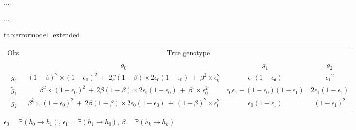 

\begin{table}[!htb]
{...

...}
{tab:errormodel_extended}
\centering
\small
\begin{threeparttable}
\renewcommand{\arraystretch}{1.1}%
\begin{tabular}{cccc}
\toprule
 Obs. & \multicolumn{3}{c}{True genotype} \\ \cmidrule(lr){2-4}
  & $g_0$ & $g_1$ & $g_2$ \\ \midrule
$\tilde{g}_0$
	&  $(1-\beta)^2\times(1-\epsilon_0)^2 ~+~ 2\beta(1-\beta)\times2\epsilon_0(1-\epsilon_0) ~+~ \beta^2\times\epsilon_0^2$
	&  $\epsilon_1 (1 - \epsilon_0)$
	&  ${\epsilon_1}^2$  \\[1.2ex]
$\tilde{g}_1$
	&  $\beta^2\times(1-\epsilon_0)^2 ~+~ 2\beta(1-\beta)\times2\epsilon_0(1-\epsilon_0) ~+~ \beta^2\times\epsilon_0^2$
	&  $\epsilon_0 \epsilon_1 + (1 - \epsilon_0)(1 - \epsilon_1)$
	&  $2 \epsilon_1 (1 - \epsilon_1)$  \\[1.2ex]
$\tilde{g}_2$
	&  $\beta^2\times(1-\epsilon_0)^2 ~+~ 2\beta(1-\beta)\times2\epsilon_0(1-\epsilon_0) ~+~ (1-\beta)^2\times\epsilon_0^2$
	&  $\epsilon_0 (1 - \epsilon_1)$
	&  $(1 - \epsilon_1)^2$  \\ \bottomrule
\end{tabular}
\begin{tablenotes}\footnotesize
	\quad $\epsilon_0 = \mathbb{P}(h_0 \rightarrow h_1)$,
	\quad $\epsilon_1 = \mathbb{P}(h_1 \rightarrow h_0)$,
  \quad $\beta = \mathbb{P}(h_k \rightarrow h_k)$
\end{tablenotes}
\end{threeparttable}
\end{table}
